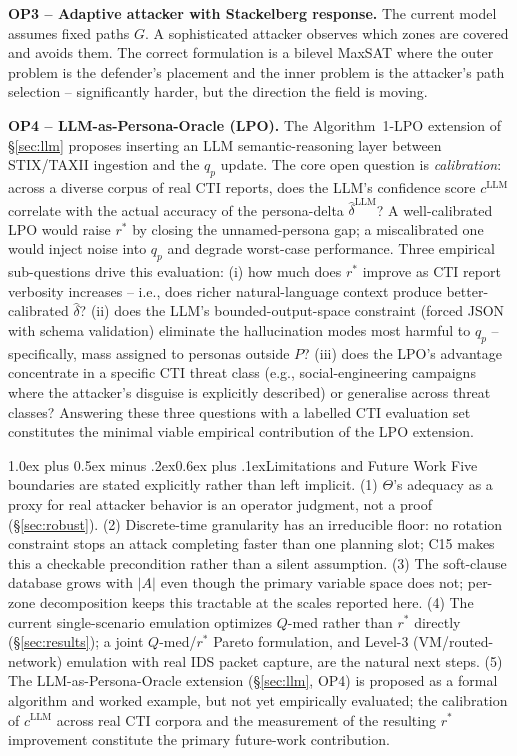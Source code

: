 \documentclass[10pt,twocolumn]{article}
\makeatletter
\renewcommand{\section}{\@startsection{section}{1}{0pt}%
  {1.0ex plus 0.5ex minus .2ex}{0.6ex plus .1ex}{\normalfont\large\bfseries}}
\makeatother
\begin{document}
\textbf{OP3 -- Adaptive attacker with Stackelberg response.} The current model assumes fixed paths $G$. A sophisticated attacker observes which zones are covered and avoids them. The correct formulation is a bilevel MaxSAT where the outer problem is the defender's placement and the inner problem is the attacker's path selection -- significantly harder, but the direction the field is moving.

\textbf{OP4 -- LLM-as-Persona-Oracle (LPO).}\label{sec:future} The Algorithm~1-LPO extension of \S\ref{sec:llm} proposes inserting an LLM semantic-reasoning layer between STIX/TAXII ingestion and the $q_p$ update. The core open question is \emph{calibration}: across a diverse corpus of real CTI reports, does the LLM's confidence score $c^{\mathrm{LLM}}$ correlate with the actual accuracy of the persona-delta $\hat{\delta}^{\mathrm{LLM}}$? A well-calibrated LPO would raise $r^*$ by closing the unnamed-persona gap; a miscalibrated one would inject noise into $q_p$ and degrade worst-case performance. Three empirical sub-questions drive this evaluation: (i) how much does $r^*$ improve as CTI report verbosity increases -- i.e., does richer natural-language context produce better-calibrated $\hat{\delta}$? (ii) does the LLM's bounded-output-space constraint (forced JSON with schema validation) eliminate the hallucination modes most harmful to $q_p$ -- specifically, mass assigned to personas outside $P$? (iii) does the LPO's advantage concentrate in a specific CTI threat class (e.g., social-engineering campaigns where the attacker's disguise is explicitly described) or generalise across threat classes? Answering these three questions with a labelled CTI evaluation set constitutes the minimal viable empirical contribution of the LPO extension.

\section{Limitations and Future Work}
Five boundaries are stated explicitly rather than left implicit. (1) $\Theta$'s adequacy as a proxy for real attacker behavior is an operator judgment, not a proof (\S\ref{sec:robust}). (2) Discrete-time granularity has an irreducible floor: no rotation constraint stops an attack completing faster than one planning slot; C15 makes this a checkable precondition rather than a silent assumption. (3) The soft-clause database grows with $|A|$ even though the primary variable space does not; per-zone decomposition keeps this tractable at the scales reported here. (4) The current single-scenario emulation optimizes $Q$-med rather than $r^*$ directly (\S\ref{sec:results}); a joint $Q$-med/$r^*$ Pareto formulation, and Level-3 (VM/routed-network) emulation with real IDS packet capture, are the natural next steps. (5) The LLM-as-Persona-Oracle extension (\S\ref{sec:llm}, OP4) is proposed as a formal algorithm and worked example, but not yet empirically evaluated; the calibration of $c^{\mathrm{LLM}}$ across real CTI corpora and the measurement of the resulting $r^*$ improvement constitute the primary future-work contribution.
\end{document}
